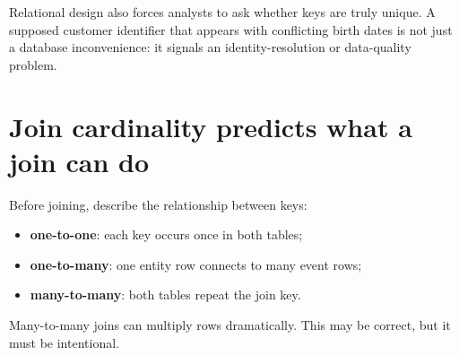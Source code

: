 Relational design also forces analysts to ask whether keys are truly unique. A supposed customer identifier that appears with conflicting birth dates is not just a database inconvenience: it signals an identity-resolution or data-quality problem.

\section{Join cardinality predicts what a join can do}
Before joining, describe the relationship between keys:
\begin{itemize}
  \item \textbf{one-to-one}: each key occurs once in both tables;
  \item \textbf{one-to-many}: one entity row connects to many event rows;
  \item \textbf{many-to-many}: both tables repeat the join key.
\end{itemize}
Many-to-many joins can multiply rows dramatically. This may be correct, but it must be intentional.

